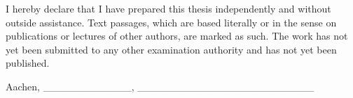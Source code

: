 I hereby declare that I have prepared this thesis independently and
without outside assistance. Text passages, which are based literally or
in the sense on publications or lectures of other authors, are marked as
such. The work has not yet been submitted to any other examination
authority and has not yet been published.

Aachen, \datum  \_\_\_\_\_\_\_\_\_\_\_\_,
\_\_\_\_\_\_\_\_\_\_\_\_\_\_\_\_\_\_\_\_\_\_\_\_
